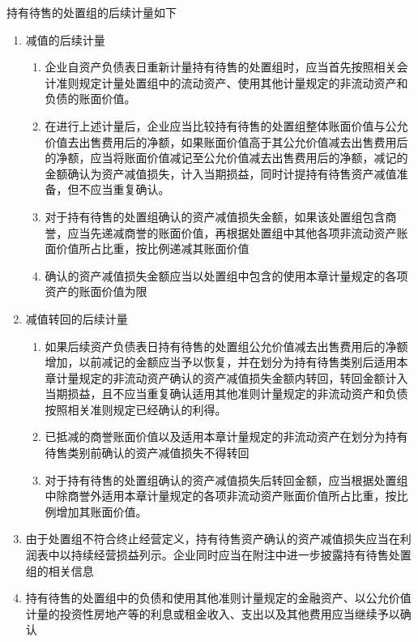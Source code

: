 \documentclass[UTF8,12pt]{ctexart}
\numberwithin{equation}{section} %
\numberwithin{figure}{section}
\numberwithin{table}{section}
\begin{document}
	持有待售的处置组的后续计量如下
	\begin{enumerate}
		\item 减值的后续计量
		\begin{enumerate}
			\item 企业自资产负债表日重新计量持有待售的处置组时，应当首先按照相关会计准则规定计量处置组中的流动资产、使用其他计量规定的非流动资产和负债的账面价值。
			
			\item 在进行上述计量后，企业应当比较持有待售的处置组整体账面价值与公允价值去出售费用后的净额，如果账面价值高于其公允价值减去出售费用后的净额，应当将账面价值减记至公允价值减去出售费用后的净额，减记的金额确认为资产减值损失，计入当期损益，同时计提持有待售资产减值准备，但不应当重复确认。
			
			\item 对于持有待售的处置组确认的资产减值损失金额，如果该处置组包含商誉，应当先递减商誉的账面价值，再根据处置组中其他各项非流动资产账面价值所占比重，按比例递减其账面价值
			
			\item 确认的资产减值损失金额应当以处置组中包含的使用本章计量规定的各项资产的账面价值为限
		\end{enumerate}
		
		\item 减值转回的后续计量
		\begin{enumerate}
			\item 如果后续资产负债表日持有待售的处置组公允价值减去出售费用后的净额增加，以前减记的金额应当予以恢复，并在划分为持有待售类别后适用本章计量规定的非流动资产确认的资产减值损失金额内转回，转回金额计入当期损益，且不应当重复确认适用其他准则计量规定的非流动资产和负债按照相关准则规定已经确认的利得。
			
			\item 已抵减的商誉账面价值以及适用本章计量规定的非流动资产在划分为持有待售类别前确认的资产减值损失不得转回
			
			\item 对于持有待售的处置组确认的资产减值损失后转回金额，应当根据处置组中除商誉外适用本章计量规定的各项非流动资产账面价值所占比重，按比例增加其账面价值。
		\end{enumerate}
		
		\item 由于处置组不符合终止经营定义，持有待售资产确认的资产减值损失应当在利润表中以持续经营损益列示。企业同时应当在附注中进一步披露持有待售处置组的相关信息
		
		\item 持有待售的处置组中的负债和使用其他准则计量规定的金融资产、以公允价值计量的投资性房地产等的利息或租金收入、支出以及其他费用应当继续予以确认
	\end{enumerate}
	
\end{document}
